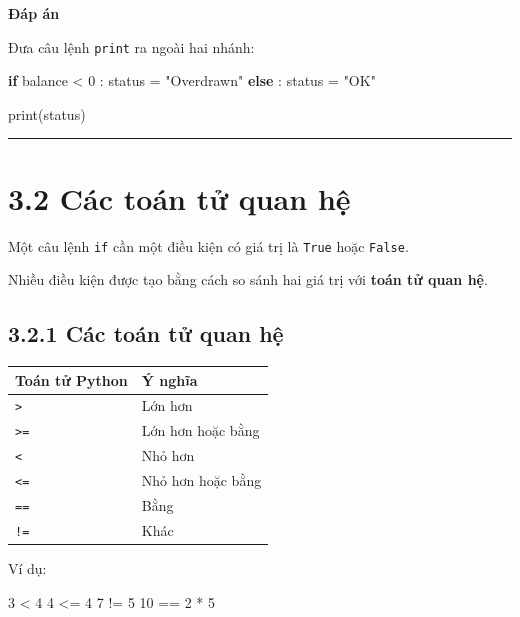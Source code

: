 \documentclass[
  11pt,
  a4paper,
]{article}
\newenvironment{Shaded}{}{}
\newcommand{\BuiltInTok}[1]{\textcolor[rgb]{0.00,0.50,0.00}{#1}}
\newcommand{\ControlFlowTok}[1]{\textcolor[rgb]{0.00,0.44,0.13}{\textbf{#1}}}
\newcommand{\DecValTok}[1]{\textcolor[rgb]{0.25,0.63,0.44}{#1}}
\newcommand{\NormalTok}[1]{#1}
\newcommand{\OperatorTok}[1]{\textcolor[rgb]{0.40,0.40,0.40}{#1}}
\newcommand{\StringTok}[1]{\textcolor[rgb]{0.25,0.44,0.63}{#1}}
\begin{document}
\textbf{Đáp án}

Đưa câu lệnh \texttt{print} ra ngoài hai nhánh:

\begin{Shaded}
\begin{Highlighting}[]
\ControlFlowTok{if}\NormalTok{ balance }\OperatorTok{\textless{}} \DecValTok{0}\NormalTok{ :}
\NormalTok{    status }\OperatorTok{=} \StringTok{"Overdrawn"}
\ControlFlowTok{else}\NormalTok{ :}
\NormalTok{    status }\OperatorTok{=} \StringTok{"OK"}

\BuiltInTok{print}\NormalTok{(status)}
\end{Highlighting}
\end{Shaded}

\begin{center}\rule{0.5\linewidth}{0.5pt}\end{center}

\section{3.2 Các toán tử quan
hệ}\label{cuxe1c-touxe1n-tux1eed-quan-hux1ec7}

Một câu lệnh \texttt{if} cần một điều kiện có giá trị là \texttt{True}
hoặc \texttt{False}.

Nhiều điều kiện được tạo bằng cách so sánh hai giá trị với \textbf{toán
tử quan hệ}.

\subsection{3.2.1 Các toán tử quan
hệ}\label{cuxe1c-touxe1n-tux1eed-quan-hux1ec7-1}

\begin{longtable}[]{@{}ll@{}}
\toprule\noalign{}
Toán tử Python & Ý nghĩa \\
\midrule\noalign{}
\endhead
\bottomrule\noalign{}
\endlastfoot
\texttt{\textgreater{}} & Lớn hơn \\
\texttt{\textgreater{}=} & Lớn hơn hoặc bằng \\
\texttt{\textless{}} & Nhỏ hơn \\
\texttt{\textless{}=} & Nhỏ hơn hoặc bằng \\
\texttt{==} & Bằng \\
\texttt{!=} & Khác \\
\end{longtable}

Ví dụ:

\begin{Shaded}
\begin{Highlighting}[]
\DecValTok{3} \OperatorTok{\textless{}} \DecValTok{4}
\DecValTok{4} \OperatorTok{\textless{}=} \DecValTok{4}
\DecValTok{7} \OperatorTok{!=} \DecValTok{5}
\DecValTok{10} \OperatorTok{==} \DecValTok{2} \OperatorTok{*} \DecValTok{5}
\end{Highlighting}
\end{Shaded}
\end{document}

